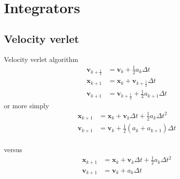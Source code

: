 \section{Integrators}
\subsection{Velocity verlet}
Velocity verlet algorithm
\begin{align}
\mathbf{v}_{k+\frac{1}{2}} &= \mathbf{v}_{k} + \frac{1}{2} a_{k} \Delta t \\
\mathbf{x}_{k+1} &= \mathbf{x}_{k} + \mathbf{v}_{k+\frac{1}{2}} \Delta t \\
\mathbf{v}_{k+1} &= \mathbf{v}_{k+\frac{1}{2}} + \frac{1}{2} a_{k+1} \Delta t
\end{align}
or more simply
\begin{align}
\mathbf{x}_{k+1} &= \mathbf{x}_{k} + \mathbf{v}_{k} \Delta t + \frac{1}{2} a_{k} \Delta t^{2} \\
\mathbf{v}_{k+1} &= \mathbf{v}_{k} + \frac{1}{2} \left(a_{k} + a_{k+1}\right) \Delta t \\
\end{align}

versus
\begin{align}
\mathbf{x}_{k+1} &= \mathbf{x}_{k} + \mathbf{v}_{k} \Delta t + \frac{1}{2} a_{k} \Delta t^{2} \\
\mathbf{v}_{k+1} &= \mathbf{v}_{k} + a_{k} \Delta t \\
\end{align}
